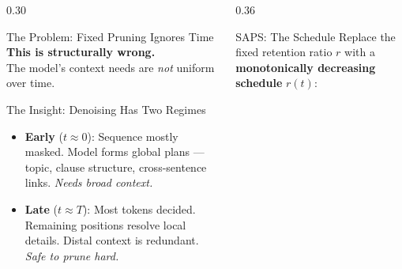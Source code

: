 \documentclass[final]{beamer}
\newcommand{\sep}{\vspace{0.8em}}
\begin{document}
\begin{frame}[t]{}
\begin{columns}[t,totalwidth=\linewidth]
\begin{column}{0.30\linewidth}
\begin{block}{The Problem: Fixed Pruning Ignores Time}
    \sep
    {\color{cmuRed}\textbf{This is structurally wrong.}}\\
    The model's context needs are \emph{not} uniform over time.
  \end{block}

  \vspace{0.8em}

  \begin{block}{The Insight: Denoising Has Two Regimes}
    \begin{center}
    \end{center}

    \begin{itemize}
      \item \textbf{Early} ($t \approx 0$): Sequence mostly masked.
            Model forms global plans — topic, clause structure,
            cross-sentence links. \emph{Needs broad context.}
      \item \textbf{Late} ($t \approx T$): Most tokens decided.
            Remaining positions resolve local details.
            Distal context is redundant. \emph{Safe to prune hard.}
    \end{itemize}
  \end{block}

\end{column}

\begin{column}{0.36\linewidth}

  \begin{alertblock}{SAPS: The Schedule}
    Replace the fixed retention ratio $r$ with a \textbf{monotonically
    decreasing schedule} $r(t)$:


\end{alertblock}
\end{column}
\end{columns}
\end{frame}
\end{document}
